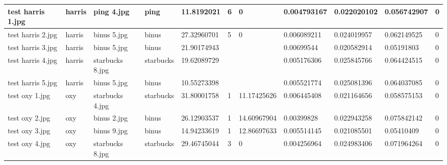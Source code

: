 \begin{landscape}
\begin{longtable}{|p{2cm}|p{1.5cm}|p{2cm}|p{1.5cm}|p{2cm}|p{1cm}|p{2cm}|p{2cm}|p{2cm}|p{2cm}|p{1cm}|}
		test harris 1.jpg    & harris           & ping 4.jpg            & ping                        & 11.8192021            & 6                       & 0                          & 0.004793167           & 0.022020102           & 0.056742907              & 0                \\ \hline
		test harris 2.jpg    & harris           & binus 5.jpg           & binus                       & 27.32960701           & 5                       & 0                          & 0.006089211           & 0.024019957           & 0.062149525              & 0                \\ \hline
		test harris 3.jpg    & harris           & binus 5.jpg           & binus                       & 21.90174943           &                         &                            & 0.00699544            & 0.020582914           & 0.05191803               & 0                \\ \hline
		test harris 4.jpg    & harris           & starbucks 8.jpg       & starbucks                   & 19.62089729           &                         &                            & 0.005176306           & 0.025845766           & 0.064424515              & 0                \\ \hline
		test harris 5.jpg    & harris           & binus 5.jpg           & binus                       & 10.55273398           &                         &                            & 0.005521774           & 0.025081396           & 0.064037085              & 0                \\ \hline
		test oxy 1.jpg       & oxy              & starbucks 4.jpg       & starbucks                   & 31.80001758           & 1                       & 11.17425626                & 0.006445408           & 0.021164656           & 0.058575153              & 0                \\ \hline
		test oxy 2.jpg       & oxy              & binus 2.jpg           & binus                       & 26.12903537           & 1                       & 14.60967904                & 0.00399828            & 0.022943258           & 0.075842142              & 0                \\ \hline
		test oxy 3.jpg       & oxy              & binus 9.jpg           & binus                       & 14.94233619           & 1                       & 12.86697633                & 0.005514145           & 0.021085501           & 0.05410409               & 0                \\ \hline
		test oxy 4.jpg       & oxy              & starbucks 8.jpg       & starbucks                   & 29.46745044           & 3                       & 0                          & 0.004256964           & 0.024983406           & 0.071964264              & 0                \\ \hline

\end{longtable}
\end{landscape}

